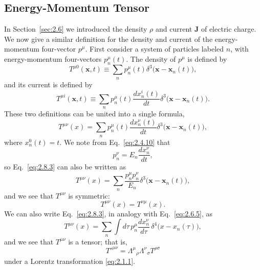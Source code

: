 
\subsection{Energy-Momentum Tensor}\label{sec:2.8}

In Section~\ref{sec:2.6} we introduced the density \(\rho\) and current
\(\mathbf J\) of electric charge. We now give a similar definition for the
density and current of the energy-momentum four-vector \(p^\mu\). First
consider a system of particles labeled \(n\), with energy-momentum four-vectors
\(p_n^\mu(t)\). The density of \(p^\mu\) is defined by
\begin{equation}
  T^{\mu0}(\mathbf x,t)
  \equiv\sum_n p_n^\mu(t)
  \delta^3\bigl(\mathbf x-\mathbf x_n(t)\bigr),
  \tag{2.8.1}\label{eq:2.8.1}
\end{equation}
and its current is defined by
\begin{equation}
  T^{\mu i}(\mathbf x,t)
  \equiv\sum_n p_n^\mu(t)\frac{dx_n^i(t)}{dt}
  \delta^3\bigl(\mathbf x-\mathbf x_n(t)\bigr).
  \tag{2.8.2}\label{eq:2.8.2}
\end{equation}
These two definitions can be united into a single formula,
\begin{equation}
  T^{\mu\nu}(x)
  =\sum_n p_n^\mu(t)\frac{dx_n^\nu(t)}{dt}
  \delta^3\bigl(\mathbf x-\mathbf x_n(t)\bigr),
  \tag{2.8.3}\label{eq:2.8.3}
\end{equation}
where \(x_n^0(t)=t\). We note from Eq.~\eqref{eq:2.4.10} that
\[
  p_n^\nu=E_n\frac{dx_n^\nu}{dt},
\]
so Eq.~\eqref{eq:2.8.3} can also be written as
\begin{equation}
  T^{\mu\nu}(x)
  =\sum_n\frac{p_n^\mu p_n^\nu}{E_n}
  \delta^3\bigl(\mathbf x-\mathbf x_n(t)\bigr),
  \tag{2.8.4}\label{eq:2.8.4}
\end{equation}
and we see that \(T^{\mu\nu}\) is symmetric:
\begin{equation}
  T^{\mu\nu}(x)=T^{\nu\mu}(x).
  \tag{2.8.5}\label{eq:2.8.5}
\end{equation}
We can also write Eq.~\eqref{eq:2.8.3}, in analogy with
Eq.~\eqref{eq:2.6.5}, as
\begin{equation}
  T^{\mu\nu}(x)
  =\sum_n\int d\tau\,p_n^\mu
    \frac{dx_n^\nu}{d\tau}\,
    \delta^4\bigl(x-x_n(\tau)\bigr),
  \tag{2.8.5a}\label{eq:2.8.5a}
\end{equation}
and we see that \(T^{\mu\nu}\) is a tensor; that is,
\[
  T'^{\mu\nu}
  =\Lambda^\mu{}_\rho\Lambda^\nu{}_\sigma T^{\rho\sigma}
\]
under a Lorentz transformation \eqref{eq:2.1.1}.

